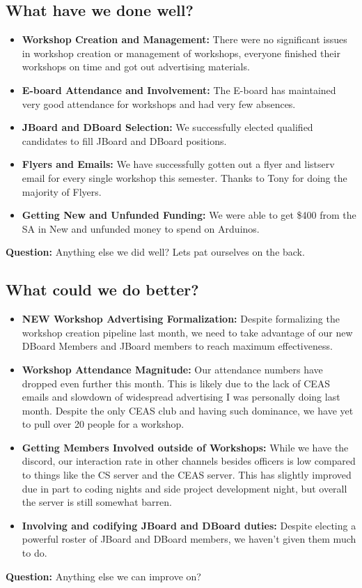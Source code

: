 \documentclass{article}
\begin{document}
\subsection{What have we done well?}
\begin{itemize}
    \item \textbf{Workshop Creation and Management:} There were no significant issues in workshop creation or management of workshops, everyone finished their workshops on time and got out advertising materials. 
    \item \textbf{E-board Attendance and Involvement:} The E-board has maintained very good attendance for workshops and had very few absences. 
    \item \textbf{JBoard and DBoard Selection:} We successfully elected qualified candidates to fill JBoard and DBoard positions. 
    \item \textbf{Flyers and Emails:} We have successfully gotten out a flyer and listserv email for every single workshop this semester. Thanks to Tony for doing the majority of Flyers.
    \item \textbf{Getting New and Unfunded Funding:} We were able to get \$400 from the SA in New and unfunded money to spend on Arduinos. 
\end{itemize}
\textbf{Question:} Anything else we did well? Lets pat ourselves on the back. 


\newpage
\subsection{What could we do better?}\label{wdb}
\begin{itemize}
    \item \textbf{NEW Workshop Advertising Formalization:} Despite formalizing the workshop creation pipeline last month, we need to take advantage of our new DBoard Members and JBoard members to reach maximum effectiveness.
    \item \textbf{Workshop Attendance Magnitude:} Our attendance numbers have dropped even further this month. This is likely due to the lack of CEAS emails and slowdown of widespread advertising I was personally doing last month. Despite the only CEAS club and having such dominance, we have yet to pull over 20 people for a workshop. 
    \item \textbf{Getting Members Involved outside of Workshops:} While we have the discord, our interaction rate in other channels besides officers is low compared to things like the CS server and the CEAS server. This has slightly improved due in part to coding nights and side project development night, but overall the server is still somewhat barren.  
    \item \textbf{Involving and codifying JBoard and DBoard duties:} Despite electing a powerful roster of JBoard and DBoard members, we haven't given them much to do.   
\end{itemize}
\textbf{Question:} Anything else we can improve on?
\end{document}
